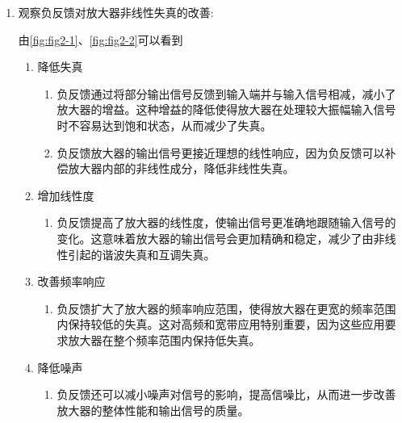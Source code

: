 \documentclass[dvipsnames, svgnames,a4paper,11pt]{article}
\begin{document}
\begin{enumerate}
				\item 观察负反馈对放大器非线性失真的改善:
					
					由\cref{fig:fig2-1}、\cref{fig:fig2-2}可以看到


						\begin{enumerate}
							\item 降低失真
							\begin{enumerate}
								\item 负反馈通过将部分输出信号反馈到输入端并与输入信号相减，减小了放大器的增益。这种增益的降低使得放大器在处理较大振幅输入信号时不容易达到饱和状态，从而减少了失真。
								\item 负反馈放大器的输出信号更接近理想的线性响应，因为负反馈可以补偿放大器内部的非线性成分，降低非线性失真。
							\end{enumerate}
							
							\item 增加线性度
							\begin{enumerate}
								\item 负反馈提高了放大器的线性度，使输出信号更准确地跟随输入信号的变化。这意味着放大器的输出信号会更加精确和稳定，减少了由非线性引起的谐波失真和互调失真。
							\end{enumerate}
					
							\item 改善频率响应
							\begin{enumerate}
								\item 负反馈扩大了放大器的频率响应范围，使得放大器在更宽的频率范围内保持较低的失真。这对高频和宽带应用特别重要，因为这些应用要求放大器在整个频率范围内保持低失真。
							\end{enumerate}
					
							\item 降低噪声
							\begin{enumerate}
								\item 负反馈还可以减小噪声对信号的影响，提高信噪比，从而进一步改善放大器的整体性能和输出信号的质量。
							\end{enumerate}
						\end{enumerate}
				
					


				


				


					
			\end{enumerate}
		
\end{document}
